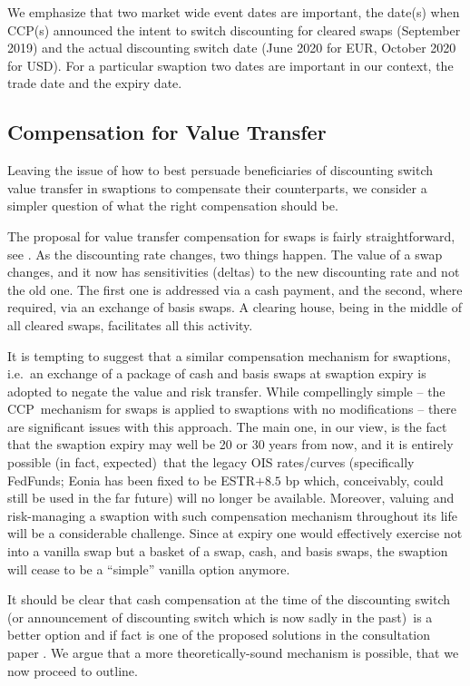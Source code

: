 \documentclass{article}
\begin{document}
We emphasize that two market wide event dates are important, the date(s)
when CCP(s) announced the intent to switch discounting for cleared swaps
(September 2019) and the actual discounting switch date (June 2020 for EUR,
October 2020 for USD). For a particular swaption two dates are important in
our context, the trade date and the expiry date.

\subsection{Compensation for Value Transfer\label{sec:swpt_comp}}

Leaving the issue of how to best persuade beneficiaries of discounting
switch value transfer in swaptions to compensate their counterparts, we
consider a simpler question of what the right compensation should be.

The proposal for value transfer compensation for swaps is fairly
straightforward, see \cite{cme-ds}. As the discounting rate changes, two
things happen. The value of a swap changes, and it now has sensitivities
(deltas) to the new discounting rate and not the old one. The first one is
addressed via a cash payment, and the second, where required, via an
exchange of basis swaps. A clearing house, being in the middle of all
cleared swaps, facilitates all this activity.

It is tempting to suggest that a similar compensation mechanism for
swaptions, i.e.\ an exchange of a package of cash and basis swaps at
swaption expiry is adopted to negate the value and risk transfer. While
compellingly simple -- the CCP\ mechanism for swaps is applied to swaptions
with no modifications -- there are significant issues with this approach.
The main one, in our view, is the fact that the swaption expiry may well be
20 or 30 years from now, and it is entirely possible (in fact, expected)\
that the legacy OIS rates/curves (specifically FedFunds; Eonia has been
fixed to be ESTR$+8.5$ bp which, conceivably, could still be used in the far
future) will no longer be available. Moreover, valuing and risk-managing a
swaption with such compensation mechanism throughout its life will be a
considerable challenge. Since at expiry one would effectively exercise not
into a vanilla swap but a basket of a swap, cash, and basis swaps, the
swaption will cease to be a ``simple'' vanilla option anymore.

It should be clear that cash compensation at the time of the discounting
switch (or announcement of discounting switch which is now sadly in the
past)\ is a better option and if fact is one of the proposed solutions in
the consultation paper \cite{arrc}. We argue that a more theoretically-sound
mechanism is possible, that we now proceed to outline.
\end{document}

